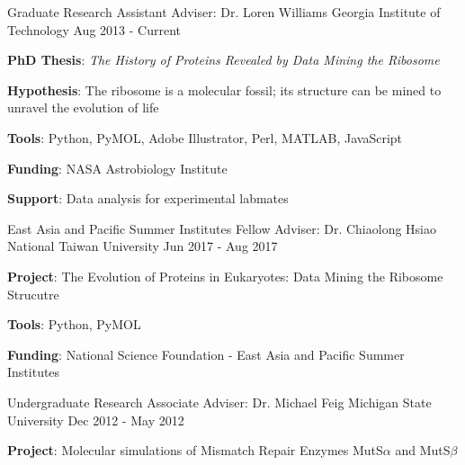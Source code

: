 

\begin{cventries}

  \cventry
    {Graduate Research Assistant} %
    {Adviser: Dr. Loren Williams} %
    {Georgia Institute of Technology} %
    {Aug 2013 - Current} %
    {{\textbf{PhD Thesis}: \textit{The History of Proteins Revealed by Data Mining the Ribosome}}
      \begin{cvitems} %
      \vspace{4.0mm}
        \item {\textbf{Hypothesis}: The ribosome is a molecular fossil; its structure can be mined to unravel the evolution of life}
        \item {\textbf{Tools}: Python, PyMOL, Adobe Illustrator, Perl, MATLAB, JavaScript}
        \item {\textbf{Funding}: NASA Astrobiology Institute}
        \item {\textbf{Support}: Data analysis for experimental labmates}
      \end{cvitems}
    }
    
  \cventry
    {East Asia and Pacific Summer Institutes Fellow} %
    {Adviser: Dr. Chiaolong Hsiao} %
    {National Taiwan University} %
    {Jun 2017 - Aug 2017} %
    {
      \begin{cvitems} %
      	\item {\textbf{Project}: The Evolution of Proteins in Eukaryotes: Data Mining the Ribosome Strucutre}
        \item {\textbf{Tools}: Python, PyMOL}
        \item {\textbf{Funding}: National Science Foundation - East Asia and Pacific Summer Institutes}
      \end{cvitems}
    }
    
  \cventry
    {Undergraduate Research Associate} %
    {Adviser: Dr. Michael Feig} %
    {Michigan State University} %
    {Dec 2012 - May 2012} %
    {
      \begin{cvitems} %
        \item {\textbf{Project}: Molecular simulations of Mismatch Repair Enzymes MutS$\alpha$ and MutS$\beta$}
      \end{cvitems}
    }


\end{cventries}
